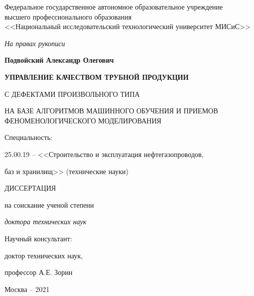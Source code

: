 \thispagestyle{empty}%
	\begin{center}
		Федеральное государственное автономное образовательное учреждение\\

		высшего профессионального образования\\

		<<Национальный исследовательский технологический университет МИСиС>>
	\end{center}
	\vspace{\baselineskip}\vspace{-5mm}

	\begin{flushright}
		\itshape
		На правах рукописи
	\end{flushright}
	\vspace{\baselineskip}\vspace{-5mm}
	
	\begin{center}
		\textbf{Подвойский Александр Олегович}
	\end{center}
	\vspace{5mm}
	
	\begin{center}
		\bfseries
			УПРАВЛЕНИЕ КАЧЕСТВОМ ТРУБНОЙ ПРОДУКЦИИ

			С ДЕФЕКТАМИ ПРОИЗВОЛЬНОГО ТИПА

			НА БАЗЕ АЛГОРИТМОВ МАШИННОГО ОБУЧЕНИЯ И ПРИЕМОВ ФЕНОМЕНОЛОГИЧЕСКОГО МОДЕЛИРОВАНИЯ
	\end{center}
	\vspace{\baselineskip}\vspace{-16mm}
	
	\begin{center}
		Специальность:
		
		25.00.19 -- <<Строительство и эксплуатация нефтегазопроводов,
		
		баз и хранилищ>> (технические науки)
	\end{center}
	\vspace{\baselineskip}\vspace{-8mm}

	\begin{center}
		ДИССЕРТАЦИЯ
		
		на соискание ученой степени
		
		\emph{доктора технических наук}
	\end{center}
	\vspace{\baselineskip}\vspace{5mm}

	\begin{flushright}
		Научный консультант:
		
		доктор технических наук,
		
		профессор А.Е. Зорин
	\end{flushright}

	\vfill
	\begin{center}
		Москва -- 2021
	\end{center}
\newpage
